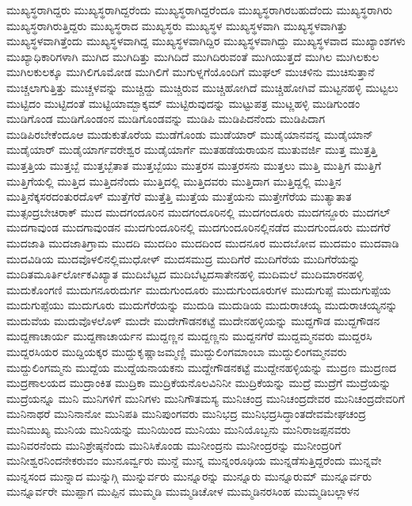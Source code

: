 {ಮುಖ್ಯಸ್ಥರಾಗಿದ್ದರು
ಮುಖ್ಯಸ್ಥರಾಗಿದ್ದರೆಂದು
ಮುಖ್ಯಸ್ಥರಾಗಿದ್ದರೆಂದೂ
ಮುಖ್ಯಸ್ಥರಾಗಿರಬಹುದೆಂದು
ಮುಖ್ಯಸ್ಥರಾಗಿರು
ಮುಖ್ಯಸ್ಥರಾಗಿರುತ್ತಿದ್ದರು
ಮುಖ್ಯಸ್ಥರಾದ
ಮುಖ್ಯಸ್ಥರು
ಮುಖ್ಯಸ್ಥಳ
ಮುಖ್ಯಸ್ಥಳವಾಗಿ
ಮುಖ್ಯಸ್ಥಳವಾಗಿತ್ತು
ಮುಖ್ಯಸ್ಥಳವಾಗಿತ್ತೆಂದು
ಮುಖ್ಯಸ್ಥಳವಾಗಿದ್ದ
ಮುಖ್ಯಸ್ಥಳವಾಗಿದ್ದಿರ
ಮುಖ್ಯಸ್ಥಳವಾಗಿದ್ದು
ಮುಖ್ಯಸ್ಥಳವಾದ
ಮುಖ್ಯಾಂಶಗಳು
ಮುಖ್ಯಾಧಿಕಾರಿಗಳಾಗಿ
ಮುಗಿದ
ಮುಗಿದಿತ್ತು
ಮುಗಿದಿದೆ
ಮುಗಿದಿರುವಂತೆ
ಮುಗಿಯುತ್ತದೆ
ಮುಗಿಲ
ಮುಗಿಲಕುಲ
ಮುಗಿಲಕುಲಕ್ಕೂ
ಮುಗಿಲಿಗೂಮೋಡ
ಮುಗಿಲಿಗೆ
ಮುಗುಳ್ನಗೆಯೊಂದಿಗೆ
ಮುಘಲ್
ಮುಚಳಿನು
ಮುಚಿಸುತ್ತಾನೆ
ಮುಚ್ಚಲಾಗುತ್ತಿತ್ತು
ಮುಚ್ಚಳವನ್ನು
ಮುಚ್ಚಿದ್ದು
ಮುಚ್ಚಿರುವ
ಮುಚ್ಚಿಹೋಗಿದೆ
ಮುಚ್ಚಿಹೋಗಿವೆ
ಮುಟ್ಟನಹಳ್ಳಿ
ಮುಟ್ಟಲು
ಮುಟ್ಟಿದಂ
ಮುಟ್ಟಿದಂತೆ
ಮುಟ್ಟಿಯಾಮ್ಬಾಕ್ಕಮ್
ಮುಟ್ಟಿರುವುದನ್ನು
ಮುಟ್ಟುಪತ್ರ
ಮುಟ್ಣಹಳ್ಳಿ
ಮುಡಿಗುಂಡಂ
ಮುಡಿಗೊಂಡ
ಮುಡಿಗೊಂಡಂನ
ಮುಡಿಗೊಂಡವನ್ನು
ಮುಡಿಪಿ
ಮುಡಿಪಿದನೆಂದು
ಮುಡಿಪಿದಾಗ
ಮುಡಿಪಿರಬೇಕೆಂದೂಆ
ಮುಡುಕುತೊರೆಯ
ಮುಡೆಗೊಂಡು
ಮುಡೆಯಾರ್
ಮುಡೈಯಾನವನ್ನ
ಮುಡೈಯಾನ್
ಮುಡೈಯಾರ್
ಮುಡೈಯಾರ್ಗವರೇಶ್ವರ
ಮುಡೈಯಾರ್ಗೆ
ಮುತಹಡೆಯರಾಯನ
ಮುತುವರ್ಜಿ
ಮುತ್ತ
ಮುತ್ತತ್ತಿ
ಮುತ್ತತ್ತಿಯ
ಮುತ್ತಬ್ಬೆ
ಮುತ್ತಬ್ಬೆತಾತ
ಮುತ್ತಬ್ಬೆಯು
ಮುತ್ತರಸ
ಮುತ್ತರಸನು
ಮುತ್ತಲು
ಮುತ್ತಿ
ಮುತ್ತಿಗ
ಮುತ್ತಿಗೆ
ಮುತ್ತಿಗೆಯಲ್ಲಿ
ಮುತ್ತಿದ
ಮುತ್ತಿದನೆಂದು
ಮುತ್ತಿದಲ್ಲಿ
ಮುತ್ತಿದವರು
ಮುತ್ತಿದಾಗ
ಮುತ್ತಿದ್ದಲ್ಲಿ
ಮುತ್ತಿನ
ಮುತ್ತಿನೆಕ್ಕಸರದಂತುರದೊಳ್
ಮುತ್ತೆಗೆರೆ
ಮುತ್ತೆತ್ತಿ
ಮುತ್ತೆಯ
ಮುತ್ತೆಯನು
ಮುತ್ತೇಗೆರೆಯ
ಮುತ್ಯಾತಾತ
ಮುತ್ಸಂದ್ರಬೇಚಿರಾಕ್
ಮುದ
ಮುದಗಂದೂರಿನ
ಮುದಗಂದೂರಿನಲ್ಲಿ
ಮುದಗಂದೂರು
ಮುದಗನ್ದೂರು
ಮುದಗಲ್
ಮುದಗಾವುಂಡ
ಮುದಗಾವುಂಡನ
ಮುದಗುಂದೂರಿನಲ್ಲಿ
ಮುದಗುಂದೂರಿನಲ್ಲಿನಡೆದ
ಮುದಗುಂದೂರು
ಮುದಗೆರೆ
ಮುದಜಾತಿ
ಮುದಜಾತಿಗ್ರಾಮ
ಮುದದಿ
ಮುದದಿಂ
ಮುದದಿಂದ
ಮುದನೂರ
ಮುದಬೋವ
ಮುದಮಂ
ಮುದವಾಡಿ
ಮುದವಿಡಿಯ
ಮುದವೊಳಲಿನಲ್ಲಿಮುಧೋಳ್
ಮುದಸಮುದ್ರ
ಮುದಿಗೆರೆ
ಮುದಿಗೆರೆಯ
ಮುದಿಗೆರೆಯನ್ನು
ಮುದಿತಮೂರ್ತಿರ್ಲೋಕವಿಖ್ಯಾತ
ಮುದಿಬೆಟ್ಟದ
ಮುದಿಬೆಟ್ಟದಸಾತೇನಹಳ್ಳಿ
ಮುದಿಮಲೆ
ಮುದಿಮಾರನಹಳ್ಳಿ
ಮುದುಕೊಂಗಣಿ
ಮುದುಗನೂರುದುರ್ಗ
ಮುದುಗುಂದೂರು
ಮುದುಗುಂದೂರುಗಳ
ಮುದುಗುಪ್ಪೆ
ಮುದುಗುಪ್ಪೆಯ
ಮುದುಗುಪ್ಪೆಯು
ಮುದುಗೂರು
ಮುದುಗೆರೆಯನ್ನು
ಮುದುಡಿ
ಮುದುಡಿಯ
ಮುದುರಾಚಯ್ಯ
ಮುದುರಾಚಯ್ಯನನ್ನು
ಮುದುವೆಯ
ಮುದುವೊಳಲೊಳ್
ಮುದೇ
ಮುದೇಗೌಡನಕಟ್ಟೆ
ಮುದೇನಹಳ್ಳಿಯನ್ನು
ಮುದ್ದಗೌಡ
ಮುದ್ದಗೌಡನ
ಮುದ್ದಣಾಚಾರ್ಯ
ಮುದ್ದಣಾಚಾರ್ಯನ
ಮುದ್ದಣ್ಣನ
ಮುದ್ದಣ್ಣನು
ಮುದ್ದನಗೆರೆ
ಮುದ್ದಮ್ಮನವರು
ಮುದ್ದರಸಿ
ಮುದ್ದರಸಿಯರ
ಮುದ್ದಿಯಕ್ಕರ
ಮುದ್ದುಕೃಷ್ಣಾಜಮ್ಮಣ್ಣಿ
ಮುದ್ದುಲಿಂಗಮಾಂಬಾ
ಮುದ್ದುಲಿಂಗಮ್ಮನವರು
ಮುದ್ದುಲಿಂಗಮ್ಮನು
ಮುದ್ದೆಯ
ಮುದ್ದೆಯನಾಯಕನು
ಮುದ್ದೇಗೌಡನಕಟ್ಟೆ
ಮುದ್ದೇನಹಳ್ಳಿಯನ್ನು
ಮುದ್ರಣ
ಮುದ್ರಣದ
ಮುದ್ರಣಾಲಯದ
ಮುದ್ರಾಂಕಿತ
ಮುದ್ರಿಕಾ
ಮುದ್ರಿಕೆಯನೊಲವಿನಿನೀ
ಮುದ್ರಿಕೆಯನ್ನು
ಮುದ್ರೆ
ಮುದ್ರೆಗೆ
ಮುದ್ರೆಯನ್ನು
ಮುದ್ರೆಯನ್ನೂ
ಮುನಿ
ಮುನಿಗಳಿಗೆ
ಮುನಿಗಳು
ಮುನಿಗೌತಮಸ್ಯ
ಮುನಿಚಂದ್ರ
ಮುನಿಚಂದ್ರದೇವರ
ಮುನಿಚಂದ್ರದೇವರಿಗೆ
ಮುನಿನಾಥರೆ
ಮುನಿನಾನೋ
ಮುನಿಪತಿ
ಮುನಿಪುಂಗವರು
ಮುನಿಭದ್ರ
ಮುನಿಭದ್ರಸಿದ್ಧಾಂತದೇವಮೇಘಚಂದ್ರ
ಮುನಿಮುಖ್ಯ
ಮುನಿಯ
ಮುನಿಯನ್ನು
ಮುನಿಯಿಂದ
ಮುನಿಯು
ಮುನಿಯೊಬ್ಬನು
ಮುನಿರಾಜಪ್ಪನವರು
ಮುನಿವರನೆಂದು
ಮುನಿಶ್ರೇಷ್ಠನೆಂದು
ಮುನಿಸಿಕೊಂಡು
ಮುನೀಂದ್ರನು
ಮುನೀಂದ್ರರನ್ನು
ಮುನೀಂದ್ರರಿಗೆ
ಮುನೀಶ್ವರನಿಂದನೇಕರುವಂ
ಮುನೂರ್ವ್ವರು
ಮುನ್ದೆ
ಮುನ್ನ
ಮುನ್ನಂರೂಢಿಯ
ಮುನ್ನಡೆಸುತ್ತಿದ್ದರೆಂದು
ಮುನ್ನವೇ
ಮುನ್ನಸಂದ
ಮುನ್ನಾದ
ಮುನ್ನುಗ್ಗಿ
ಮುನ್ನುರ್ವರು
ಮುನ್ನೂರನ್ನು
ಮುನ್ನೂರು
ಮುನ್ನೂರುಮ್
ಮುನ್ನೂರ್ವರು
ಮುನ್ನೂರ್ವರೇ
ಮುಪ್ಪಾಗ
ಮುಪ್ಪಿನ
ಮುಮ್ಮಡಿ
ಮುಮ್ಮಡಿಚೋಳ
ಮುಮ್ಮಡಿನರಸಿಂಹ
ಮುಮ್ಮಡಿಬಲ್ಲಾಳನ
}
